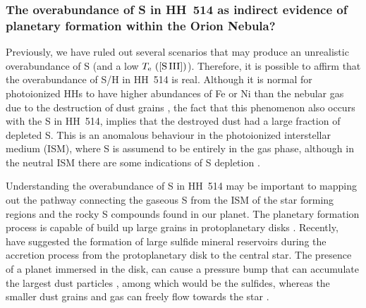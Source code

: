 \documentclass[fleqn,usenatbib]{mnras}
\newcommand{\eduardo}[1]{{\color{teal}E: #1}}
\newcommand{\jorge}[1]{{\color{magenta}J: #1}}
\begin{document}




\subsubsection{The overabundance of S in HH~514 as indirect evidence of planetary formation within the Orion Nebula?}
\label{subsec:real_overabundance}

Previously, we have ruled out several scenarios that may produce an unrealistic overabundance of S (and a low $T_{\rm e} \text{ ([S\thinspace III])}$). Therefore, it is possible to affirm that the overabundance of S/H in HH~514 is real. Although it is normal for photoionized HHs to have higher abundances of Fe or Ni than the nebular gas due to the destruction of dust grains \citep[][]{Blagrave06, mesadelgado09, mendez2021, mendez2021-2}, the fact that this phenomenon also occurs with the S in HH~514, implies that the destroyed dust had a large fraction of depleted S. This is an anomalous behaviour in the photoionized interstellar medium (ISM), where S is assumend to be entirely in the gas phase, although in the neutral ISM there are some indications of S depletion \citep[][]{Jenkins09}.

Understanding the overabundance of S in HH~514 may be important to mapping out the pathway connecting the gaseous S from the ISM of the star forming regions and the rocky S compounds found in our planet. The planetary formation process is capable of build up large grains in protoplanetary disks \citep[][]{Beckwith2000}. Recently, \citet{Kama19} have suggested the formation of large sulfide mineral reservoirs during the accretion process from the protoplanetary disk to the central star. The presence of a planet immersed in the disk, can cause a pressure bump that can accumulate the largest dust particles \citep{Pinilla2012,Birnstiel16}, among which would be the sulfides, whereas the smaller dust grains and gas can freely flow towards the star \citep[][]{Kama19}.
\end{document}

